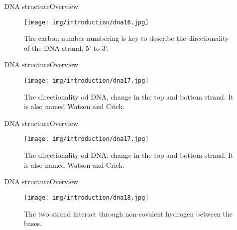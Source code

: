 \documentclass[10pt]{beamer}
\newcommand{\1}{
	\setbeamertemplate{background}{
		\texttt{[image: img/1]}
		\tikz[overlay] \fill[fill opacity=0.75,fill=white] (0,0) rectangle (-\paperwidth,\paperheight);
	}
}
\begin{document}
\begin{frame}{DNA structure}{Overview}
	\begin{figure}[]
		\centering
		\texttt{[image: img/introduction/dna16.jpg]}
		\label{img:mot2}
		\caption{The carbon number numbering is key to describe the directionality of the DNA strand, 5' to 3'.}
	\end{figure}
\end{frame}

\begin{frame}{DNA structure}{Overview}
	\begin{figure}[]
		\centering
		\texttt{[image: img/introduction/dna17.jpg]}
		\label{img:mot2}
		\caption{The directionality od DNA, change in the top and bottom strand. It is also named Watson and Crick. }
	\end{figure}
\end{frame}

\begin{frame}{DNA structure}{Overview}
	\begin{figure}[]
		\centering
		\texttt{[image: img/introduction/dna17.jpg]}
		\label{img:mot2}
		\caption{The directionality od DNA, change in the top and bottom strand. It is also named Watson and Crick. }
	\end{figure}
\end{frame}

\begin{frame}{DNA structure}{Overview}
	\begin{figure}[]
		\centering
		\texttt{[image: img/introduction/dna18.jpg]}
		\label{img:mot2}
		\caption{The two strand interact through non-covalent hydrogen between the bases.}
	\end{figure}
\end{frame}
\end{document}
